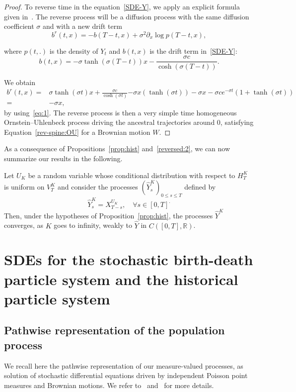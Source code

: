 \documentclass[AHL,Unicode,longabstracts,published]{cedram}
\newcommand*\R{\mathbb{R}}
\newcommand*\s{\sigma}
\let\oldforall\forall
\renewcommand*{\forall}{\mathrel{\oldforall}}
\begin{document}
\begin{proof}
To reverse time in the equation~\eqref{SDE-Y}, we apply an explicit formula given in~\cite{haussmannpardoux}. The reverse process will be a diffusion process with the same diffusion coefficient $\sigma $ and with a new drift term
\[
b^{r}(t,x)=-b(T-t,x)+\sigma^{2}\partial_{x}\log p(T-t,x),
\]

where $p(t,.)$ is the density of $ Y_{t}$ and $b(t,x)$ is the drift term in~\eqref{SDE-Y}:
\[
b(t,x)=-\sigma\tanh(\s(T-t))x-\frac{\s c}{\cosh\left(\s(T-t)\right)}.
\]

We obtain
\begin{align*}
b^{r}(t,x)= & \sigma\tanh(\s t)x+\frac{\s c}{\cosh\left(\s t \right)} {-\sigma x\left(\tanh(\s t) \right)-\sigma x-\sigma ce^{-\s t}\left(1+\tanh(\s t) \right)}\\
= & -\sigma x,
\end{align*}
by using~\eqref{eq:1}. The reverse process is then a very simple time homogeneous Ornstein--Uhlenbeck process driving the ancestral trajectories around $0$, satisfying Equation~\eqref{rev-spine:OU} for a Brownian motion $W$.
\end{proof}

As a consequence of Propositions~\ref{prop:hist} and~\ref{reversed:2}, we can now summarize our results in the following.

\begin{theo}\label{thm:conclusion}
Let $U_{K}$ be a random variable whose conditional distribution with respect to $H^{K}_{T}$ is uniform on $V^{K}_{T}$ and consider the processes $(\widehat{Y}^{K}_{s})_{0 \leq s \leq T}$ defined by
\[
\widehat{Y}^{K}_{s}=X^{U_{K}}_{T-s}, \quad \forall s\in[0,T]^.
\]
Then, under the hypotheses of Proposition~\ref{prop:hist}, the processes $\widehat{Y}^{K}$ converges, as $K$ goes to infinity, weakly to $\widehat{Y}$ in $C([0,T],\R)$.
\end{theo}



\appendix

\section{SDEs for the stochastic birth-death particle system and the historical particle system}\label{app:sde-section}


\subsection{Pathwise representation of the population process}\label{app:sde}
We recall here the pathwise representation of our measure-valued processes, as solution of stochastic differential equations driven by independent Poisson point measures and Brownian motions. We refer to~\cite{champagnatmeleard} and~\cite{meleardtran_suphist} for more details.
\end{document}
